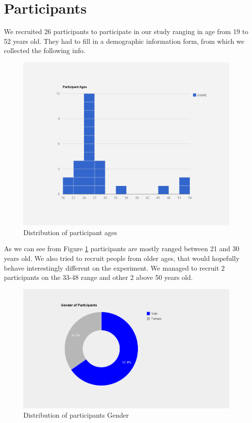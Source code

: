 \section{Participants}

We recruited 26 participants to participate in our study ranging in age from 19 to 52 years old. They had to fill in a demographic information form, from which we collected the following info.

\begin{figure}[H]
\centering
\includegraphics[scale=0.3]{figures/participantAge.png}
\caption{Distribution of participant ages}
\label{fig:participantAge}
\end{figure}

As we can see from Figure \ref{fig:participantAge} participants are mostly ranged between 21 and 30 years old. We also tried to recruit people from older ages, that would hopefully behave interestingly different on the experiment. We managed to recruit 2 participants on the 33-48 range and other 2 above 50 years old.

\begin{figure}[H]
\centering
\includegraphics[scale=0.3]{figures/participantGender.png}
\caption{Distribution of participants Gender}
\label{fig:participantGender}
\end{figure}

